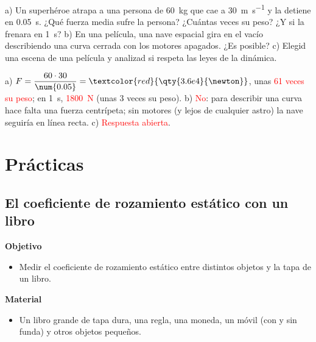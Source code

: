\begin{exercise}
    a) Un superhéroe atrapa a una persona de \qty{60}{\kg} que cae a \qty{30}{\m\per\s} y la detiene en \qty{0.05}{\s}. ¿Qué fuerza media
    sufre la persona? ¿Cuántas veces su peso? ¿Y si la frenara en \qty{1}{\s}? b) En una película, una nave espacial gira en el vacío
    describiendo una curva cerrada con los motores apagados. ¿Es posible? c) Elegid una escena de una película y analizad si respeta las
    leyes de la dinámica.
    \begin{solu}
        a) \(F = \dfrac{60 \cdot 30}{\num{0.05}} = \textcolor{red}{\qty{3.6e4}{\newton}}\), unas \textcolor{red}{61 veces su peso}; en
        \qty{1}{\s}, \textcolor{red}{\qty{1800}{\newton}} (unas 3 veces su peso). b) \textcolor{red}{No}: para describir una curva hace
        falta una fuerza centrípeta; sin motores (y lejos de cualquier astro) la nave seguiría en línea recta. c) \textcolor{red}{Respuesta
        abierta}.
    \end{solu}
\end{exercise}

\section{Prácticas}\label{sec:ud11-practicas}

\subsection{El coeficiente de rozamiento estático con un libro}

\noindent\begin{minipage}[t]{0.48\textwidth}
    \textbf{Objetivo}
    \begin{itemize}
        \item Medir el coeficiente de rozamiento estático entre distintos objetos y la tapa de un libro.
    \end{itemize}
\end{minipage}\hfill
\begin{minipage}[t]{0.48\textwidth}
    \textbf{Material}
    \begin{itemize}
        \item Un libro grande de tapa dura, una regla, una moneda, un móvil (con y sin funda) y otros objetos pequeños.
    \end{itemize}
\end{minipage}

